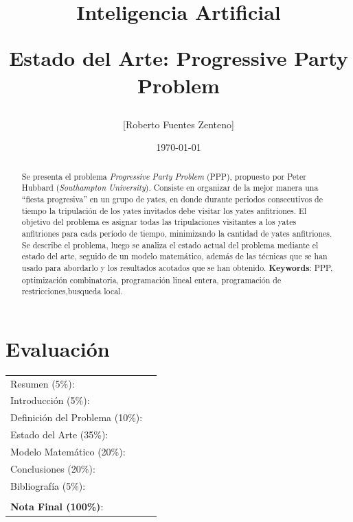 \documentclass[letter, 10pt]{article}
\begin{document}
\title{Inteligencia Artificial \\ \begin{Large}Estado del Arte: Progressive Party Problem\end{Large}}
\author{[Roberto Fuentes Zenteno]}
\date{\today}
\maketitle


\section*{Evaluaci\'on}

\begin{tabular}{ll}
Resumen (5\%): & \underline{\hspace{2cm}} \\
Introducci\'on (5\%):  & \underline{\hspace{2cm}} \\
Definici\'on del Problema (10\%):  & \underline{\hspace{2cm}} \\
Estado del Arte (35\%):  & \underline{\hspace{2cm}} \\
Modelo Matem\'atico (20\%): &  \underline{\hspace{2cm}}\\
Conclusiones (20\%): &  \underline{\hspace{2cm}}\\
Bibliograf\'ia (5\%): & \underline{\hspace{2cm}}\\
 &  \\
\textbf{Nota Final (100\%)}:   & \underline{\hspace{2cm}}
\end{tabular}
\vspace{2cm}


\begin{abstract}
Se presenta el problema \textit{Progressive Party Problem} (PPP), propuesto por Peter Hubbard (\textit{Southampton
University}). Consiste en organizar de la mejor manera una ``fiesta progresiva'' en un grupo de yates, en donde durante periodos consecutivos de tiempo la tripulación de los yates invitados debe visitar los yates anfitriones. El objetivo del problema es asignar todas las tripulaciones visitantes a los yates anfitriones para cada período de tiempo, minimizando la cantidad de yates anfitriones. Se describe el problema, luego se analiza el estado actual del problema mediante el estado del arte, seguido de un modelo matemático, además de las técnicas que se han usado para abordarlo y los resultados acotados que se han obtenido. 
\textbf{Keywords}: PPP, optimización combinatoria, programación lineal entera, programación de restricciones,busqueda local.
\end{abstract}
\end{document}
